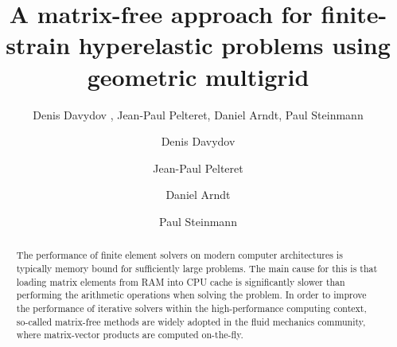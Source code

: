 \documentclass[times,doublespace]{nmeauth}
\begin{document}
\ifijnme
{}
\else
{}
\begin{frontmatter}
\fi

\title{
  A matrix-free approach for finite-strain hyperelastic problems using geometric multigrid
  }

\ifijnme
  \author{
    Denis Davydov \corrauth ,
    Jean-Paul Pelteret,
    Daniel Arndt,
    Paul Steinmann
  }

  \address{
    Chair of Applied Mechanics,
    Friedrich-Alexander-Universit\"{a}t Erlangen-N\"{u}rnberg,
    Egerlandstr.\ 5, 91058 Erlangen, Germany \break
    Interdisciplinary Center for Scientific Computing (IWR),
    Heidelberg University,
    Im Neuenheimer Feld 205, 69120 Heidelberg, Germany \break
    Glasgow Computational Engineering Center (GCEC),
        University of Glasgow, G12 8QQ Glasgow, United Kingdom \break
    }


\else
  \author[a]{Denis Davydov}

  \author[a]{Jean-Paul Pelteret}

  \author[b]{Daniel Arndt}

  \author[a,c]{Paul Steinmann}


  \address[a]{Chair of Applied Mechanics,
  Friedrich-Alexander-Universit\"{a}t Erlangen-N\"{u}rnberg,
  Egerlandstr.\ 5, 91058 Erlangen, Germany}

  \address[b]{Interdisciplinary Center for Scientific Computing (IWR),
      Heidelberg University,
      Im Neuenheimer Feld 205,
      69120 Heidelberg,
      Germany}

  \address[c]{Glasgow Computational Engineering Center (GCEC),
      University of Glasgow, G12 8QQ Glasgow, United Kingdom
  }
\fi


  \begin{abstract}
    The performance of finite element solvers on modern computer architectures is typically memory bound for sufficiently large problems.
    The main cause for this is that loading matrix elements from RAM into CPU cache is significantly slower than performing the arithmetic operations when solving the problem.
    In order to improve the performance of iterative solvers within the high-performance computing context, so-called matrix-free methods are
    widely adopted in the fluid mechanics community, where matrix-vector products are computed on-the-fly.


\end{abstract}
\end{frontmatter}
\end{document}

